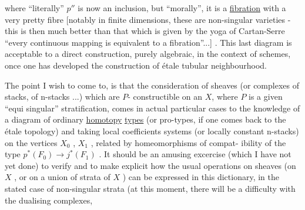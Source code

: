 
where ``literally'' $p''$ is now an inclusion, but ``morally'', it is
a \uline{fibration} with a very pretty fibre [notably in finite dimensions,
these are non-singular varieties - this is then much better than
that which is given by the yoga of Cartan-Serre ``every continuous
mapping is equivalent to a fibration''...] . This last diagram
is acceptable to a direct construction, purely algebraic, in the
context of schemes, once one has developed the construction of
étale tubular neighbourhood.

The point I wish to come to, is that the consideration of
sheaves (or complexes of stacks, of n-stacks ...) which are $P$-%
constructible on an $X$, where $P$ is a given ``equi singular''
stratification, comes in actual particular cases to the knowledge
of a diagram of ordinary \uline{homotopy} \uline{types} (or pro-types, if one
comes back to the étale topology)
and taking local coefficients systems (or locally constant n-stacks)
on the vertices $X_0$ , $X_1$ , related by homeomorphisms of compat-%
ibility of the type $p^*(F_0) \to j^*(F_1)$ . It should be an amusing
excercise (which I have not yet done) to verify and to make
explicit how the usual operations on sheaves (on $X$ , or on a union
of strata of $X$ ) can be expressed in this dictionary, in the
stated case of non-singular strata (at this moment, there will be
a difficulty with the dualising complexes,

